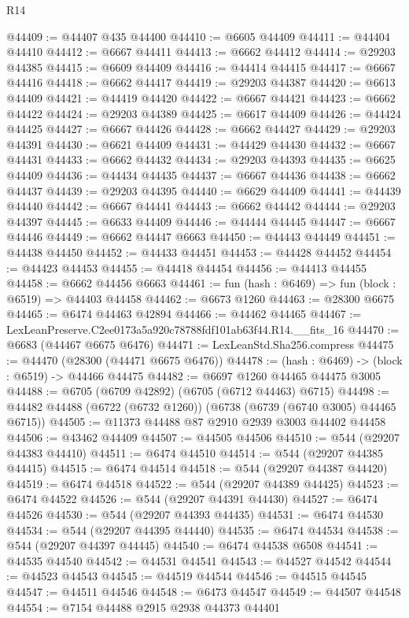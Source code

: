 \begin{lexlean}{R14}
\begin{coremodule}
@44409 := @44407 @435 @44400
@44410 := @6605 @44409
@44411 := @44404 @44410
@44412 := @6667 @44411
@44413 := @6662 @44412
@44414 := @29203 @44385
@44415 := @6609 @44409
@44416 := @44414 @44415
@44417 := @6667 @44416
@44418 := @6662 @44417
@44419 := @29203 @44387
@44420 := @6613 @44409
@44421 := @44419 @44420
@44422 := @6667 @44421
@44423 := @6662 @44422
@44424 := @29203 @44389
@44425 := @6617 @44409
@44426 := @44424 @44425
@44427 := @6667 @44426
@44428 := @6662 @44427
@44429 := @29203 @44391
@44430 := @6621 @44409
@44431 := @44429 @44430
@44432 := @6667 @44431
@44433 := @6662 @44432
@44434 := @29203 @44393
@44435 := @6625 @44409
@44436 := @44434 @44435
@44437 := @6667 @44436
@44438 := @6662 @44437
@44439 := @29203 @44395
@44440 := @6629 @44409
@44441 := @44439 @44440
@44442 := @6667 @44441
@44443 := @6662 @44442
@44444 := @29203 @44397
@44445 := @6633 @44409
@44446 := @44444 @44445
@44447 := @6667 @44446
@44449 := @6662 @44447 @6663
@44450 := @44443 @44449
@44451 := @44438 @44450
@44452 := @44433 @44451
@44453 := @44428 @44452
@44454 := @44423 @44453
@44455 := @44418 @44454
@44456 := @44413 @44455
@44458 := @6662 @44456 @6663
@44461 := fun (hash : @6469) => fun (block : @6519) => @44403 @44458
@44462 := @6673 @1260
@44463 := @28300 @6675
@44465 := @6474 @44463 @42894
@44466 := @44462 @44465
@44467 := LexLeanPreserve.C2ee0173a5a920c78788fdf101ab63f44.R14.__fits_16
@44470 := @6683 (@44467 @6675 @6476)
@44471 := LexLeanStd.Sha256.compress
@44475 := @44470 (@28300 (@44471 @6675 @6476))
@44478 := (hash : @6469) -> (block : @6519) -> @44466 @44475
@44482 := @6697 @1260 @44465 @44475 @3005
@44488 := @6705 (@6709 @42892) (@6705 (@6712 @44463) @6715)
@44498 := @44482 @44488 (@6722 (@6732 @1260)) (@6738 (@6739 (@6740 @3005) @44465 @6715))
@44505 := @11373 @44488 @87 @2910 @2939 @3003 @44402 @44458
@44506 := @43462 @44409
@44507 := @44505 @44506
@44510 := @544 (@29207 @44383 @44410)
@44511 := @6474 @44510
@44514 := @544 (@29207 @44385 @44415)
@44515 := @6474 @44514
@44518 := @544 (@29207 @44387 @44420)
@44519 := @6474 @44518
@44522 := @544 (@29207 @44389 @44425)
@44523 := @6474 @44522
@44526 := @544 (@29207 @44391 @44430)
@44527 := @6474 @44526
@44530 := @544 (@29207 @44393 @44435)
@44531 := @6474 @44530
@44534 := @544 (@29207 @44395 @44440)
@44535 := @6474 @44534
@44538 := @544 (@29207 @44397 @44445)
@44540 := @6474 @44538 @6508
@44541 := @44535 @44540
@44542 := @44531 @44541
@44543 := @44527 @44542
@44544 := @44523 @44543
@44545 := @44519 @44544
@44546 := @44515 @44545
@44547 := @44511 @44546
@44548 := @6473 @44547
@44549 := @44507 @44548
@44554 := @7154 @44488 @2915 @2938 @44373 @44401

\end{coremodule}
\end{lexlean}
